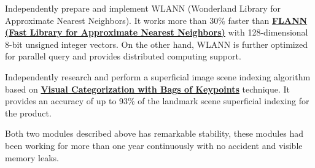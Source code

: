 \documentclass[]{deedy-resume-openfont}
\begin{document}
\begin{minipage}[t]{0.66\textwidth}
\begin{tightemize}
\item Independently prepare and implement WLANN (Wonderland Library for Approximate Nearest Neighbors). It works more than 30\% faster than \textbf{\href{http://www.cs.ubc.ca/research/flann}{FLANN (Fast Library for Approximate Nearest Neighbors)}} with 128-dimensional 8-bit unsigned integer vectors. On the other hand, WLANN is further optimized for parallel query and provides distributed computing support.
\item Independently research and perform a superficial image scene indexing algorithm based on \textbf{\href{https://people.eecs.berkeley.edu/~efros/courses/AP06/Papers/csurka-eccv-04.pdf}{Visual Categorization with Bags of Keypoints}} technique. It provides an accuracy of up to 93\% of the landmark scene superficial indexing for the product.
\item Both two modules described above has remarkable stability, these modules had been working for more than one year continuously with no accident and visible memory leaks.
\end{tightemize}
\sectionsep




\end{minipage}
\end{document}
